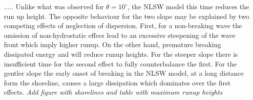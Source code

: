 \documentclass[review]{elsarticle}
\newcommand{\BoussClaw}{\textsc{BoussClaw} }
\begin{document}
.....
Unlike what was observed for $\theta=10^\circ$, the NLSW model this time
reduces the run up height. The opposite behaviour for the two slope may be 
explained by two competing effects of neglection of dispersion. First, for a
 non-breaking wave the omission of non-hydrostatic effecs lead to an excessive 
steepening of the wave front which imply higher runup. On the other hand, 
premature breaking dissipated energy and will reduce runup heights. For the 
steeper slope there is insufficient time for the second effect to fully 
counterbalance the first. For the gentler slope the early onset of breaking
in the NLSW model, at a long distance form the shoreline, causes a large 
dissipation which dominates over the first effects.   
{\em Add figure with shorelines and table with maximum runup heights}





\end{document}
